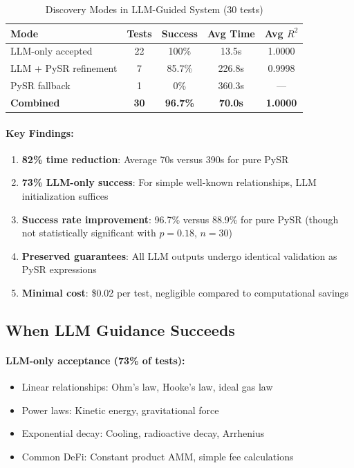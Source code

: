 \documentclass[twoside,11pt]{article}
\begin{document}
\begin{table}[htbp]
\centering
\caption{Discovery Modes in LLM-Guided System (30 tests)}
\label{tab:discovery_modes}
\begin{tabular}{@{}lcccc@{}}
\toprule
\textbf{Mode} & \textbf{Tests} & \textbf{Success} & \textbf{Avg Time} & \textbf{Avg $R^2$} \\
\midrule
LLM-only accepted & 22 & 100\% & 13.5s & 1\citep{kambhampati2024llms}.0000 \\
LLM + PySR refinement & 7 & 85.7\% & 226.8s & 0\citep{kambhampati2024llms}.9998 \\
PySR fallback & 1 & 0\% & 360.3s & --- \\
\midrule
\textbf{Combined} & \textbf{30} & \textbf{96.7\%} & \textbf{70.0s} & \textbf{1.0000} \\
\bottomrule
\end{tabular}
\end{table}

\paragraph{Key Findings:}

\begin{enumerate}
\item \textbf{82\% time reduction}: Average 70s versus 390s for pure PySR
\item \textbf{73\% LLM-only success}: For simple well-known relationships, LLM initialization suffices\citep{kambhampati2024llms}
\item \textbf{Success rate improvement}: 96.7\% versus 88.9\% for pure PySR (though not statistically significant with $p = 0.18$, $n = 30$)
\item \textbf{Preserved guarantees}: All LLM outputs undergo identical validation as PySR expressions\citep{kambhampati2024llms}
\item \textbf{Minimal cost}: \$0.02 per test, negligible compared to computational savings
\end{enumerate}

\subsection{When LLM Guidance Succeeds}\citep{kambhampati2024llms}

\paragraph{LLM-only acceptance (73\% of tests):}\citep{kambhampati2024llms}
\begin{itemize}
\item Linear relationships: Ohm's law, Hooke's law, ideal gas law
\item Power laws: Kinetic energy, gravitational force
\item Exponential decay: Cooling, radioactive decay, Arrhenius
\item Common DeFi: Constant product AMM, simple fee calculations
\end{itemize}
\end{document}
